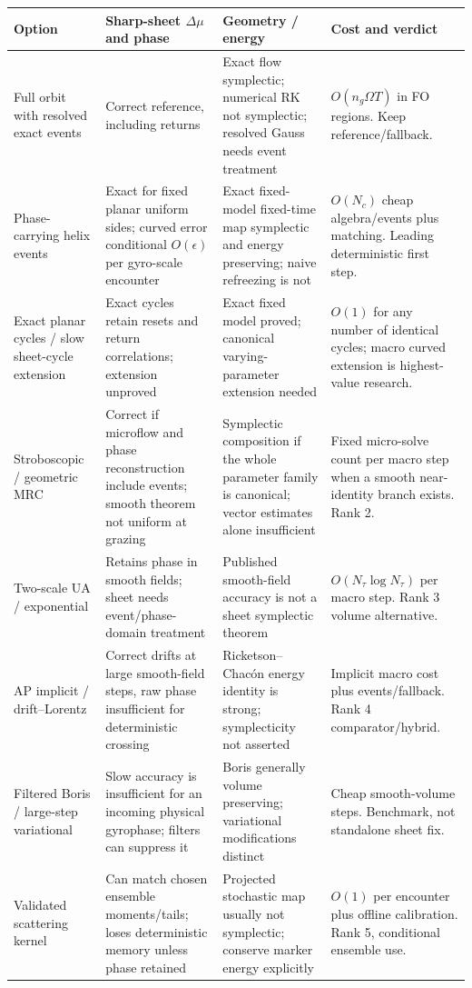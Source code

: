 \documentclass[10pt,a4paper]{article}
\begin{document}
\begin{longtable}{p{.20\linewidth}p{.25\linewidth}p{.22\linewidth}p{.22\linewidth}}
\toprule
Option & Sharp-sheet $\Delta\mu$ and phase & Geometry / energy & Cost and verdict\\\midrule\endhead
Full orbit with resolved exact events & Correct reference, including returns & Exact flow symplectic; numerical RK not symplectic; resolved Gauss needs event treatment & $O(n_g\Omega T)$ in FO regions. Keep reference/fallback.\\
Phase-carrying helix events & Exact for fixed planar uniform sides; curved error conditional $O(\epsilon)$ per gyro-scale encounter & Exact fixed-model fixed-time map symplectic and energy preserving; naive refreezing is not & $O(N_c)$ cheap algebra/events plus matching. Leading deterministic first step.\\
Exact planar cycles / slow sheet-cycle extension & Exact cycles retain resets and return correlations; extension unproved & Exact fixed model proved; canonical varying-parameter extension needed & $O(1)$ for any number of identical cycles; macro curved extension is highest-value research.\\
Stroboscopic / geometric MRC & Correct if microflow and phase reconstruction include events; smooth theorem not uniform at grazing & Symplectic composition if the whole parameter family is canonical; vector estimates alone insufficient & Fixed micro-solve count per macro step when a smooth near-identity branch exists. Rank 2.\\
Two-scale UA / exponential & Retains phase in smooth fields; sheet needs event/phase-domain treatment & Published smooth-field accuracy is not a sheet symplectic theorem & $O(N_\tau\log N_\tau)$ per macro step. Rank 3 volume alternative.\\
AP implicit / drift--Lorentz & Correct drifts at large smooth-field steps, raw phase insufficient for deterministic crossing & Ricketson--Chac\'on energy identity is strong; symplecticity not asserted & Implicit macro cost plus events/fallback. Rank 4 comparator/hybrid.\\
Filtered Boris / large-step variational & Slow accuracy is insufficient for an incoming physical gyrophase; filters can suppress it & Boris generally volume preserving; variational modifications distinct & Cheap smooth-volume steps. Benchmark, not standalone sheet fix.\\
Validated scattering kernel & Can match chosen ensemble moments/tails; loses deterministic memory unless phase retained & Projected stochastic map usually not symplectic; conserve marker energy explicitly & $O(1)$ per encounter plus offline calibration. Rank 5, conditional ensemble use.\\

\end{longtable}
\end{document}
